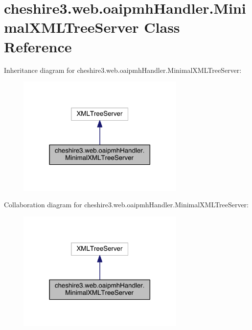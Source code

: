 \hypertarget{classcheshire3_1_1web_1_1oaipmh_handler_1_1_minimal_x_m_l_tree_server}{\section{cheshire3.\-web.\-oaipmh\-Handler.\-Minimal\-X\-M\-L\-Tree\-Server Class Reference}
\label{classcheshire3_1_1web_1_1oaipmh_handler_1_1_minimal_x_m_l_tree_server}
}


Inheritance diagram for cheshire3.\-web.\-oaipmh\-Handler.\-Minimal\-X\-M\-L\-Tree\-Server\-:
\nopagebreak
\begin{figure}[H]
\begin{center}
\leavevmode
\includegraphics[width=234pt]{classcheshire3_1_1web_1_1oaipmh_handler_1_1_minimal_x_m_l_tree_server__inherit__graph}
\end{center}
\end{figure}


Collaboration diagram for cheshire3.\-web.\-oaipmh\-Handler.\-Minimal\-X\-M\-L\-Tree\-Server\-:
\nopagebreak
\begin{figure}[H]
\begin{center}
\leavevmode
\includegraphics[width=234pt]{classcheshire3_1_1web_1_1oaipmh_handler_1_1_minimal_x_m_l_tree_server__coll__graph}
\end{center}
\end{figure}
